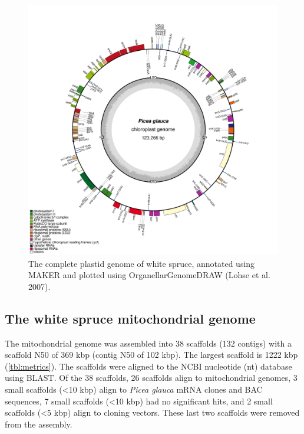 \documentclass[
  12pt,
  oneside,
  openany]{book}
\begin{document}
\begin{figure}
\hypertarget{fig:cpgenes}{%
\centering
\includegraphics{whitespruce/plastid-annotation.png}
\caption[The complete plastid genome of white spruce, annotated using MAKER and plotted using OrganellarGenomeDRAW (Lohse et al. 2007).]{The complete plastid genome of white spruce, annotated using MAKER and plotted using OrganellarGenomeDRAW (Lohse et al. 2007).}\label{fig:cpgenes}
}
\end{figure}

\hypertarget{the-white-spruce-mitochondrial-genome}{%
\subsection{The white spruce mitochondrial genome}\label{the-white-spruce-mitochondrial-genome}}

The mitochondrial genome was assembled into 38 scaffolds (132 contigs) with a scaffold N50 of 369 kbp (contig N50 of 102 kbp). The largest scaffold is 1222 kbp (\cref{tbl:metrics}). The scaffolds were aligned to the NCBI nucleotide (nt) database using BLAST. Of the 38 scaffolds, 26 scaffolds align to mitochondrial genomes, 3 small scaffolds (\textless10 kbp) align to \emph{Picea glauca} mRNA clones and BAC sequences, 7 small scaffolds (\textless10 kbp) had no significant hits, and 2 small scaffolds (\textless5 kbp) align to cloning vectors. These last two scaffolds were removed from the assembly.
\end{document}
